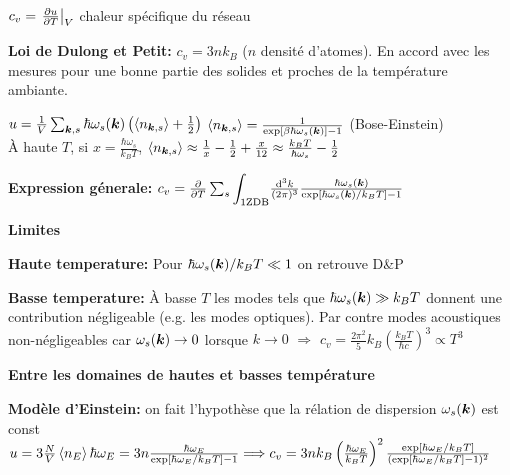 \begin{squishlist}
    \item $c_v = \left.\D{T}{u}\right|_V$ chaleur spécifique du réseau
    \item \textbf{Loi de Dulong et Petit:} $c_v = 3n k_B$ ($n$ densité d'atomes). En accord avec les mesures pour une bonne partie des solides et proches de la température ambiante.
    \item $u = \frac{1}{V} \sum_{\vk,s} \hbar \omega_s(\vk) \left( \braket{n_{\vk,s}}+\frac{1}{2}\right)$ \quad $\braket{n_{\vk,s}} = \frac{1}{\exp[\beta \hbar \omega_s(\vk)]-1}$ (Bose-Einstein) \\
    À haute $T$, si $x = \frac{\hbar \omega_s}{k_B T}$, $\braket{n_{\vk,s}} \approx \frac{1}{x} - \frac{1}{2} + \frac{x}{12} \approx \frac{k_BT}{\hbar \omega_s} - \frac{1}{2}$
    
    \item \textbf{Expression génerale:} $c_v = \D{T}{} \sum_s {\displaystyle\int_{\text{1ZDB}}} \frac{\ud^3 k}{(2\pi)^3} \frac{\hbar \omega_s(\vk)}{\exp[\hbar \omega_s(\vk)/k_B T]-1}$
    
    \squishline

    \textbf{Limites }
    \item \textbf{Haute temperature:} Pour $\hbar \omega_s(\vk)/k_BT \ll 1$ on retrouve D\&P
    \item \textbf{Basse temperature:} À basse $T$ les modes tels que $\hbar \omega_s(\vk) \gg k_BT$ donnent une contribution négligeable (e.g. les modes optiques). Par contre modes acoustiques non-négligeables car $\omega_s(\vk) \rightarrow 0$ lorsque $k \rightarrow 0$ $\Longrightarrow$ $c_v = \frac{2\pi^2}{5}k_B \left(\frac{k_B T}{\hbar c}\right)^3 \propto T^3$
    
    \squishline

    \textbf{Entre les domaines de hautes et basses température}

    \item \textbf{Modèle d'Einstein:} on fait l'hypothèse que la rélation de dispersion $\omega_s(\vk)$ est const \\
    $u = 3 \frac{N}{V} \braket{n_E}\hbar \omega_E = 3n \frac{\hbar \omega_E}{\exp[\hbar \omega_E/k_BT]-1} \Longrightarrow c_v = 3nk_B \left(\frac{\hbar \omega_E}{k_BT}\right)^2 \frac{\exp[\hbar \omega_E /k_BT]}{(\exp[\hbar \omega_E /k_BT] - 1)^2}$


\end{squishlist}
